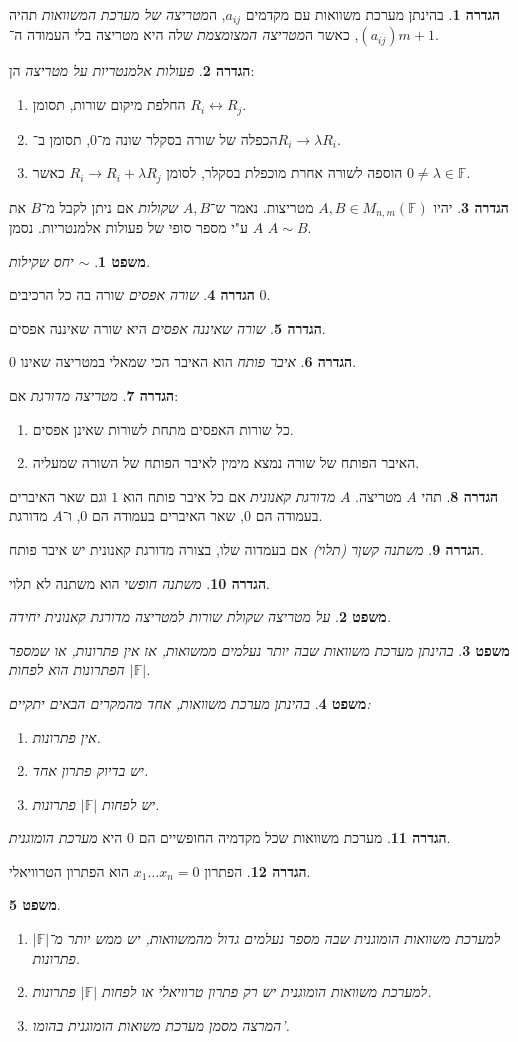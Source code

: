 \documentclass[]{article}
\newcommand\lra       {\leftrightarrow}
\newcommand\F         {\mathbb{F}}
\renewcommand\lg      {\lambda}
\newtheorem{Theorem}{משפט}
\theoremstyle{definition}
\newtheorem{definition}{הגדרה}
\newcommand\theo  [1] {\begin{Theorem}#1\end{Theorem}}
\newcommand\defi  [1] {\begin{definition}#1\end{definition}}
\begin{document}
\begin{multicols}{2}
		\defi{בהינתן מערכת משוואות עם מקדמים $a_{ij}$, ה\textit{מטריצה של מערכת המשוואות} תהיה $(a_{ij})$, כאשר ה\textit{מטריצה המצומצמת} שלה היא מטריצה בלי העמודה ה־$m + 1$. 
		}
		\defi{\textit{פעולות אלמנטריות על מטריצה} הן: 
		\begin{enumerate}
			\item החלפת מיקום שורות, תסומן $R_i \lra R_j$. 
			\item הכפלה של שורה בסקלר שונה מ־$0$, תסומן ב־$R_i \to \lg R_i$. 
			\item הוספה לשורה אחרת מוכפלת בסקלר, לסומן $R_i \to R_i + \lg R_j$ כאשר $0 \neq \lg \in \F$. 
		\end{enumerate}}
		\defi{יהיו $A, B \in M_{n, m}(\F)$ מטריצות. נאמר ש־$A, B$ \textit{שקולות} אם ניתן לקבל מ־$B$ את $A$ ע"י מספר סופי של פעולות אלמנטריות. נסמן $A \sim B$. }
		\theo{$\sim$ יחס שקילות. }
		\defi{\textit{שורה אפסים} שורה בה כל הרכיבים $0$.}
		\defi{\textit{שורה שאיננה אפסים} היא שורה שאיננה אפסים. }
		\defi{\textit{איבר פותח} הוא האיבר הכי שמאלי במטריצה שאינו 0. }
		\defi{\textit{מטריצה מדורגת} אם: 
		\begin{enumerate}
			\item כל שורות האפסים מתחת לשורות שאינן אפסים. 
			\item האיבר הפותח של שורה נמצא מימין לאיבר הפותח של השורה שמעליה. 
		\end{enumerate}}
		\defi{תהי $A$ מטריצה. $A$ \textit{מדורגת קאנונית} אם כל איבר פותח הוא $1$ וגם שאר האיברים בעמודה הם $0$, שאר האיברים בעמודה הם $0$, ו־$A$ מדורגת.}
		\defi{\textit{משתנה קשןר (תלוי)} אם בעמדוה שלו, בצורה מדורגת קאנונית יש איבר פותח. }
		\defi{\textit{משתנה חופשי} הוא משתנה לא תלוי. }
		\theo{על מטריצה שקולת שורות למטריצה מדורגת קאנונית יחידה. }
		\theo{בהינתן מערכת משוואות שבה יותר נעלמים ממשואות, אז אין פתרונות, או שמספר הפתרונות הוא לפחות $|\F|$.  }
		\theo{בהינתן מערכת משוואות, אחד מהמקרים הבאים יתקיים: 
		\begin{enumerate}
			\item אין פתרונות. 
			\item יש בדיוק פתרון אחד. 
			\item יש לפחות $|\F|$ פתרונות. 
		\end{enumerate}}
		\defi{מערכת משוואות שכל מקדמיה החופשיים הם $0$ היא \textit{מערכת הומוגנית}. }
		\defi{הפתרון $x_1 \dots x_n = 0$ הוא הפתרון הטרוויאלי. }
		\theo{\, 
		\begin{enumerate}
			\item למערכת משוואות הומוגנית שבה מספר נעלמים גדול מהמשוואות, יש ממש יותר מ־$|\F|$ פתרונות. 
			\item למערכת משוואות הומוגנית יש רק פתרון טרוויאלי או לפחות $|\F|$ פתרונות. 
			\item המרצה מסמן מערכת משואות הומוגנית בהומו'. 
		\end{enumerate}}
		

\end{multicols}
\end{document}
